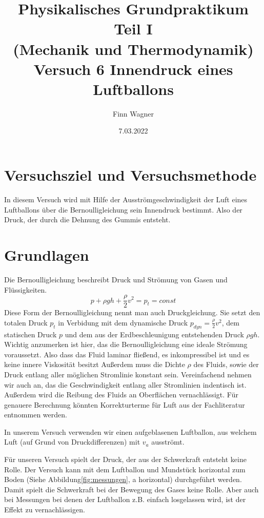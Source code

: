 \documentclass{article}
\date{7.03.2022}
\title{Physikalisches Grundpraktikum Teil I \\ (Mechanik und Thermodynamik) \\ Versuch 6 Innendruck eines Luftballons}
\author{Finn Wagner}
\begin{document}
    \maketitle

    \section{Versuchsziel und Versuchsmethode}
    In diesem Versuch wird mit Hilfe der Ausströmgeschwindigkeit der Luft eines Luftballons über die Bernoulligleichung sein Innendruck bestimmt.
    Also der Druck, der durch die Dehnung des Gummis entsteht.

    \section{Grundlagen}
    Die Bernoulligleichung beschreibt Druck und Strömung von Gasen und Flüssigkeiten.
    \begin{equation} \label{eq:bernoulli}
        p + \rho g h + \frac{\rho}{2} v^2 = p_t = const
    \end{equation}
    Diese Form der Bernoulligleichung nennt man auch Druckgleichung.
    Sie setzt den totalen Druck \( p_t \) in Verbidung mit dem dynamische Druck \(p_{dyn} = \frac{\rho}{2} v^2\), 
    dem statischen Druck \( p \) und dem aus der Erdbeschleunigung entstehenden Druck \( \rho g h  \).
    Wichtig anzumerken ist hier, das die Bernoulligleichung eine ideale Strömung voraussetzt.
    Also dass das Fluid laminar fließend, es inkompressibel ist und es keine innere Viskosität besitzt 
    Außerdem muss die Dichte \( \rho \) des Fluids, sowie der Druck entlang aller möglichen Stromlinie konstant sein.
    Vereinfachend nehmen wir auch an, das die Geschwindigkeit entlang aller Stromlinien indentisch ist. \cite{Aufgabenstellung}
    Außerdem wird die Reibung des Fluids an Oberflächen vernachlässigt.
    Für genauere Berechnung könnten Korrekturterme für Luft aus der Fachliteratur entnommen werden.

    In unserem Versuch verwenden wir einen aufgeblasenen Luftballon, aus welchem Luft (auf Grund von Druckdifferenzen) mit \(v_a\) ausströmt. 

    Für unseren Versuch spielt der Druck, der aus der Schwerkraft entsteht keine Rolle.
    Der Versuch kann mit dem Luftballon und Mundstück horizontal zum Boden (Siehe Abbildung\ref{fig:messungen}, a horizontal) durchgeführt werden.
    Damit spielt die Schwerkraft bei der Bewegung des Gases keine Rolle. Aber auch bei Messungen bei denen der Luftballon z.B. einfach losgelassen wird,
    ist der Effekt zu vernachlässigen.
\end{document}
